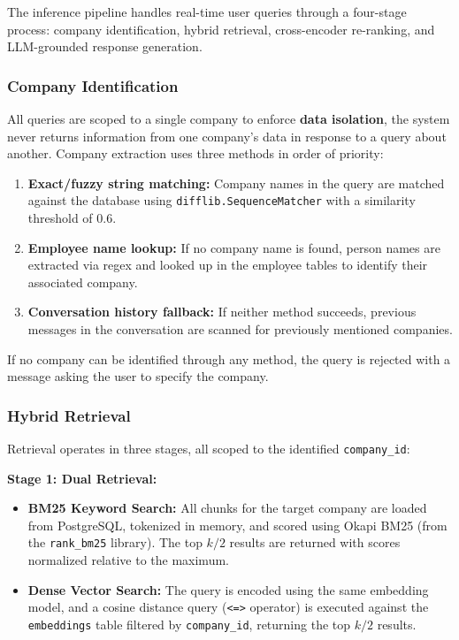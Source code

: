 The inference pipeline handles real-time user queries through a four-stage process: company identification, hybrid retrieval, cross-encoder re-ranking, and LLM-grounded response generation.

\subsubsection{Company Identification}

All queries are scoped to a single company to enforce \textbf{data isolation}, the system never returns information from one company's data in response to a query about another. Company extraction uses three methods in order of priority:

\begin{enumerate}
    \item \textbf{Exact/fuzzy string matching:} Company names in the query are matched against the database using \texttt{difflib.SequenceMatcher} with a similarity threshold of 0.6.
    \item \textbf{Employee name lookup:} If no company name is found, person names are extracted via regex and looked up in the employee tables to identify their associated company.
    \item \textbf{Conversation history fallback:} If neither method succeeds, previous messages in the conversation are scanned for previously mentioned companies.
\end{enumerate}

If no company can be identified through any method, the query is rejected with a message asking the user to specify the company.

\subsubsection{Hybrid Retrieval}

Retrieval operates in three stages, all scoped to the identified \texttt{company\_id}:

\textbf{Stage 1: Dual Retrieval:}
\begin{itemize}
    \item \textbf{BM25 Keyword Search:} All chunks for the target company are loaded from PostgreSQL, tokenized in memory, and scored using Okapi BM25 (from the \texttt{rank\_bm25} library). The top $k/2$ results are returned with scores normalized relative to the maximum.
    \item \textbf{Dense Vector Search:} The query is encoded using the same embedding model, and a cosine distance query (\texttt{<=>} operator) is executed against the \texttt{embeddings} table filtered by \texttt{company\_id}, returning the top $k/2$ results.
\end{itemize}


